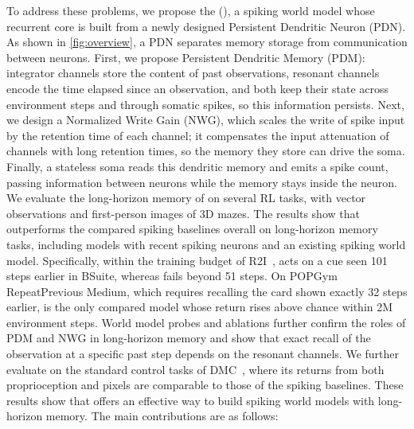To address these problems, we propose the \methodfull (\method), a spiking world model whose recurrent core is built from a newly designed Persistent Dendritic Neuron (PDN).
As shown in \cref{fig:overview}, a PDN separates memory storage from communication between neurons.
First, we propose Persistent Dendritic Memory (PDM): integrator channels store the content of past observations, resonant channels~\cite{izhikevich2001resonate} encode the time elapsed since an observation, and both keep their state across environment steps and through somatic spikes, so this information persists.
Next, we design a Normalized Write Gain (NWG), which scales the write of spike input by the retention time of each channel; it compensates the input attenuation of channels with long retention times, so the memory they store can drive the soma.
Finally, a stateless soma reads this dendritic memory and emits a spike count, passing information between neurons while the memory stays inside the neuron.
We evaluate the long-horizon memory of \method on several RL tasks, with vector observations and first-person images of 3D mazes.
The results show that \method outperforms the compared spiking baselines overall on long-horizon memory tasks, including models with recent spiking neurons and an existing spiking world model.
Specifically, within the training budget of R2I~\cite{samsami2024r2i}, \method acts on a cue seen 101 steps earlier in BSuite, whereas \dv fails beyond 51 steps.
On POPGym RepeatPrevious Medium, which requires recalling the card shown exactly 32 steps earlier, \method is the only compared model whose return rises above chance within 2M environment steps.
World model probes and ablations further confirm the roles of PDM and NWG in long-horizon memory and show that exact recall of the observation at a specific past step depends on the resonant channels.
We further evaluate \method on the standard control tasks of DMC~\cite{tassa2018dmc}, where its returns from both proprioception and pixels are comparable to those of the spiking baselines.
These results show that \method offers an effective way to build spiking world models with long-horizon memory.
The main contributions are as follows:
